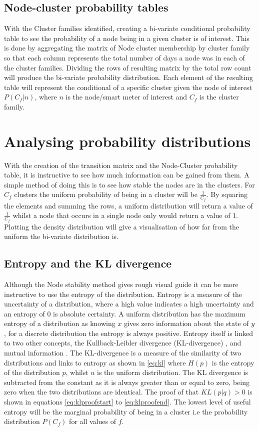 \subsection{Node-cluster probability tables}
\label{sec:NodeClustProb}

With the Cluster families identified, creating a bi-variate conditional probability table to see the probability of a node being in a given cluster is of interest.  This is done by aggregating the matrix of Node cluster membership by cluster family so that each column represents the total number of days a node was in each of the cluster families. Dividing the rows of resulting matrix by the total row count will produce the bi-variate probability distribution. Each element of the resulting table will represent the conditional of a specific cluster given the node of interest $P(C_f|n)$, where $n$ is the node/smart meter of interest and $C_f$ is the cluster family.

\section{Analysing probability distributions}

With the creation of the transition matrix and the Node-Cluster probability table, it is instructive to see how much information can be gained from them. A simple method of doing this is to see how stable the nodes are in the clusters. For $C_f$ clusters the uniform probability of being in a cluster will be $\frac{1}{C_f}$. By squaring the elements and summing the rows, a uniform distribution will return a value of $\frac{1}{C_f}$ whilst a node that occurs in a single node only would return a value of 1. Plotting the density distribution will give a visualisation of how far from the uniform the bi-variate distribution is.

\subsection{Entropy and the KL divergence}
Although the Node stability method gives rough visual guide it can be more instructive to use the entropy of the distribution. Entropy is a measure of the uncertainty of a distribution, where a high value indicates a high uncertainty and an entropy of 0 is absolute certainty. A uniform distribution has the maximum entropy of a distribution as knowing $x$ gives zero information about the state of $y$, for a discrete distribution the entropy is always positive. Entropy itself is linked to two other concepts, the Kullback-Leibler divergence (KL-divergence) \cite{kullback1951} , and mutual information \cite{barber2012}. The KL-divergence is a measure of the similarity of two distributions and links to entropy as shown in \ref{eq:kl} where $H(p)$ is the entropy of the distribution $p$, whilst $u$ is the uniform distribution. The KL divergence is subtracted from the constant as it is always greater than or equal to zero, being zero when the two distributions are identical. The proof of that $KL(p|q)>0$ is shown in equations \ref{eq:klproofstart} to \ref{eq:klproofend}. The lowest level of useful entropy will be the marginal probability of being in a cluster i.e the probability distribution $P(C_f)$ for all values of $f$.

